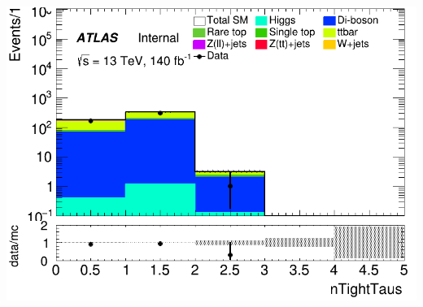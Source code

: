 \documentclass[usenames,dvipsnames]{beamer}
\begin{document}
\begin{frame}
\begin{minipage}{0.32\textwidth}
        \includegraphics[width=\textwidth]{graphics/LLH_met/LLH_met_nTightTaus.png}
    \end{minipage}
\end{frame}
\end{document}
